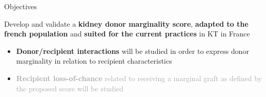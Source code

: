 \documentclass[final]{beamer}
\let\olditem\item
\renewcommand\item{\olditem\justifying}
\newlength{\colwidth}
\begin{document}
\begin{frame}[t]
\begin{columns}[t]
\begin{column}{\colwidth}




  \begin{block}{Objectives}

    Develop and validate a \textbf{\textcolor{nottblue}{kidney donor marginality score}}, \textbf{adapted to the french population} and \textbf{suited for the current practices} in KT in France

    \begin{itemize}
      \item \textbf{Donor/recipient interactions} will be studied in order to express donor marginality in relation to recipient characteristics
      \item \textcolor{darkgray}{\textbf{Recipient loss-of-chance} related to receiving a marginal graft as defined by the proposed score will be studied}
    \end{itemize}

  \end{block}


\end{column}
\end{columns}
\end{frame}
\end{document}
